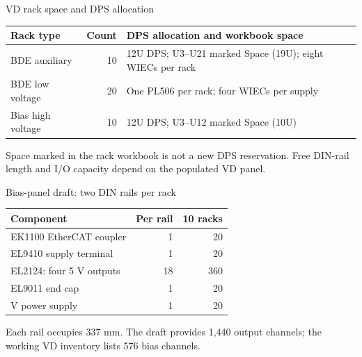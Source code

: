 \begin{frame}{VD rack space and DPS allocation}
  \renewcommand{\arraystretch}{1.4}
  \begin{tabularx}{\textwidth}{@{}>{\RaggedRight\arraybackslash}p{3.4cm}r>{\RaggedRight\arraybackslash}X@{}}
    \toprule
    \textbf{Rack type} & \textbf{Count} & \textbf{DPS allocation and workbook space}\\
    \midrule
    BDE auxiliary & 10 & 12U DPS; U3--U21 marked Space (19U); eight WIECs per rack\\
    BDE low voltage & 20 & One PL506 per rack; four WIECs per supply\\
    Bias high voltage & 10 & 12U DPS; U3--U12 marked Space (10U)\\
    \bottomrule
  \end{tabularx}\par
  \bigskip
  Space marked in the rack workbook is not a new DPS reservation.
  Free DIN-rail length and I/O capacity depend on the populated VD panel.
\end{frame}

\begin{frame}{Bias-panel draft: two DIN rails per rack}
  \renewcommand{\arraystretch}{1.3}
  \begin{tabularx}{\textwidth}{@{}>{\RaggedRight\arraybackslash}Xrr@{}}
    \toprule
    \textbf{Component} & \textbf{Per rail} & \textbf{10 racks}\\
    \midrule
    EK1100 EtherCAT coupler & 1 & 20\\
    EL9410 supply terminal & 1 & 20\\
    EL2124: four 5 V outputs & 18 & 360\\
    EL9011 end cap & 1 & 20\\
    24 V power supply & 1 & 20\\
    \bottomrule
  \end{tabularx}\par
  \medskip
  Each rail occupies 337 mm. The draft provides 1,440 output channels;
  the working VD inventory lists 576 bias channels.\par
\end{frame}

